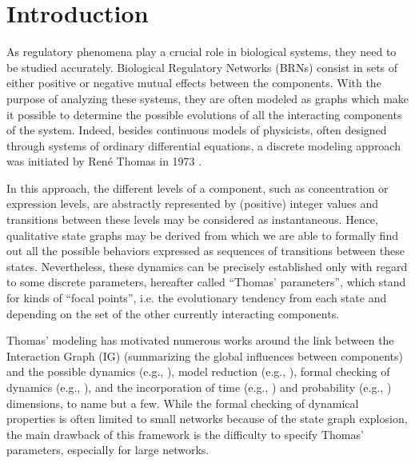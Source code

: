 \section{Introduction}
As regulatory phenomena play a crucial role in biological systems, they need to be studied accurately.
Biological Regulatory Networks (BRNs) consist in sets of either positive or negative mutual effects between the components.
With the purpose of analyzing these systems, they are often modeled as graphs which make it possible to determine the possible evolutions of all the interacting components of the system.
Indeed, besides continuous models of physicists, often designed through systems of ordinary
differential equations, a discrete modeling approach was initiated by René Thomas in 1973
\cite{Thomas73}.

In this approach, the different levels of a component, such as concentration or expression levels, are abstractly represented by (positive) integer values and transitions between these levels may be considered as instantaneous.
Hence, qualitative state graphs may be derived from which we are able to formally find out all the possible behaviors expressed as sequences of transitions between these states.
Nevertheless, these dynamics can be precisely established only with regard to some discrete parameters,
hereafter called ``Thomas' parameters'',
which stand for kinds of ``focal points'', i.e. the evolutionary tendency from each state and depending on the set of the other currently interacting components.

Thomas' modeling has motivated numerous works around the link between the Interaction Graph (IG)
(summarizing the global influences between components) and the possible dynamics (e.g.,
\cite{RiCo07,RRT08}),
model reduction (e.g., \cite{Naldi09}), formal checking of dynamics (e.g., \cite{Richard06,Naldi07}), 
and the incorporation of time (e.g., \cite{Siebert06,Ahmad08}) and probability
(e.g., \cite{Twardziok10-CMSB}) dimensions, to name but a few.
While the formal checking of dynamical properties is often limited to small networks because of the
state graph explosion, the main drawback of this framework is the difficulty to specify Thomas'
parameters, especially for large networks.

